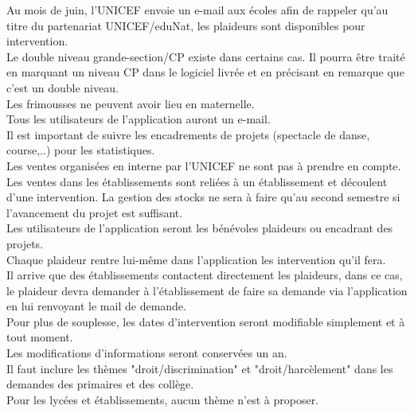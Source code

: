 \documentclass [a4paper] {article}
\begin{document}
Au mois de juin, l'UNICEF envoie un e-mail aux écoles afin de rappeler qu'au titre du partenariat UNICEF/eduNat, les plaideurs sont disponibles pour intervention.
\\

Le double niveau grande-section/CP existe dans certains cas. Il pourra être traité en marquant un niveau CP dans le logiciel livrée et en précisant en remarque que c'est un double niveau.
\\

Les frimousses ne peuvent avoir lieu en maternelle.
\\

Tous les utilisateurs de l'application auront un e-mail.
\\

Il est important de suivre les encadrements de projets (spectacle de danse, course,..) pour les statistiques.
\\

Les ventes organisées en interne par l'UNICEF ne sont pas à prendre en compte. Les ventes dans les établissements sont reliées à un établissement et découlent d'une intervention. La gestion des stocks ne sera à faire qu'au second semestre si l'avancement du projet est suffisant.
\\

Les utilisateurs de l'application seront les bénévoles plaideurs ou encadrant des projets.
\\

Chaque plaideur rentre lui-même dans l'application les intervention qu'il fera.
\\

Il arrive que des établissements contactent directement les plaideurs, dans ce cas, le plaideur devra demander à l'établissement de faire sa demande via l'application en lui renvoyant le mail de demande.
\\

Pour plus de souplesse, les dates d'intervention seront modifiable simplement et à tout moment.
\\

Les modifications d'informations seront conservées un an.
\\

Il faut inclure les thèmes "droit/discrimination" et "droit/harcèlement" dans les demandes des primaires et des collège.
\\

Pour les lycées et établissements, aucun thème n'est à proposer.
\\
\end{document}
